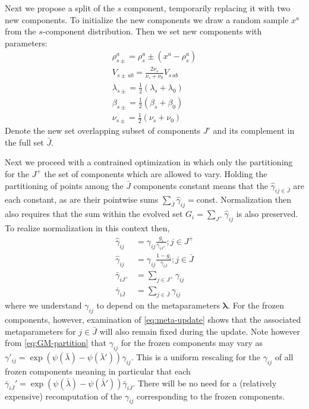 \documentclass[aps,showpacs,twocolumn,prd,superscriptaddress,nofootinbib]{revtex4}
\newcommand{\nn}{\nonumber}
\begin{document}
Next we propose a split of the $s$ component, temporarily replacing it with two new components.  To initialize the new components we draw a random sample $x^a$ from the $s$-component distribution. Then we set new components with parameters:
\begin{align}
  \rho^a_{s\pm}=\rho^a_s\pm(x^a-\rho^a_{s})\nn\\
  V_{s\pm\,ab}=\frac{2\nu_s}{\nu_s+\nu_0}V_{s\,ab}\nn\\
  \lambda_{s\pm}=\frac12(\lambda_s+\lambda_0)\nn\\
  \beta_{s\pm}=\frac12(\beta_s+\beta_0)\nn\\
  \nu_{s\pm}=\frac12(\nu_s+\nu_0)\label{eq:split}
\end{align}
Denote the new set overlapping subset of components $J'$ and its complement in the full set $\bar J$.

Next we proceed with a contrained optimization in which only the partitioning for the $J^+$
the set of components which are allowed to vary.  Holding the partitioning of points among the $\bar J$ components constant means that the $\hat\gamma_{ij\in \bar J}$ are each constant, as are their pointwise sums $\sum_{\bar J}\hat\gamma_{ij}=$const. Normalization then also requires that the sum within the evolved set $G_i=\sum_{J^+}\hat\gamma_{ij}$ is also preserved.  To realize normalization in this context then,
\begin{align}
  \hat\gamma_{ij}&=\gamma_{ij}\frac{g_i}{\bar\gamma_{iJ^+}};j\in J^+\nn\\
  \hat\gamma_{ij}&=\gamma_{ij}\frac{1-g_i}{\bar\gamma_{i\bar J}};j\in \bar J\nn\\
  \bar\gamma_{iJ^+}&=\sum_{j\in J^+}\gamma_{ij}\nn\\
  \bar\gamma_{i\bar J}&=\sum_{j\in \bar J}\gamma_{ij}\nn
\end{align}
where we understand $\gamma_{ij}$ to depend on the metaparameters $\bm\lambda$.  For the frozen components, however, examination of \eqref{eq:meta-update} shows that the associated metaparameters for $j\in\bar J$ will also remain fixed during the update.  Note however from \eqref{eq:GM-partition} that $\gamma_{ij}$ for the frozen components may vary as $\gamma'_{ij}=\exp(\psi(\bar\lambda)-\psi(\bar\lambda'))\gamma_{ij}$.  This is a uniform rescaling for the $\gamma_{ij}$ of all frozen components meaning in particular that each $\bar\gamma_{i\bar J}'=\exp(\psi(\bar\lambda)-\psi(\bar\lambda'))\bar\gamma_{i\bar J}$. There will be no need for a (relatively expensive) recomputation of the $\gamma_{ij}$ corresponding to the frozen components.
\end{document}
